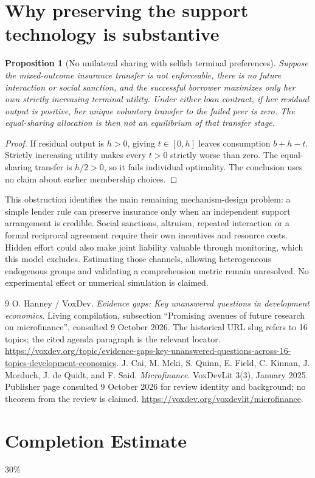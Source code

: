 \documentclass[11pt]{article}
\newtheorem{proposition}[theorem]{Proposition}
\theoremstyle{remark}
\begin{document}
\section{Why preserving the support technology is substantive}
\begin{proposition}[No unilateral sharing with selfish terminal preferences]
Suppose the mixed-outcome insurance transfer is not enforceable, there is
no future interaction or social sanction, and the successful borrower
maximizes only her own strictly increasing terminal utility. Under either
loan contract, if her residual output is positive, her unique voluntary
transfer to the failed peer is zero. The equal-sharing allocation is then
not an equilibrium of that transfer stage.
\end{proposition}
\begin{proof}
If residual output is $h>0$, giving $t\in[0,h]$ leaves consumption
$b+h-t$. Strictly increasing utility makes every $t>0$ strictly worse
than zero. The equal-sharing transfer is $h/2>0$, so it fails individual
optimality. The conclusion uses no claim about earlier membership choices.
\end{proof}
This obstruction identifies the main remaining mechanism-design problem:
a simple lender rule can preserve insurance only when an independent
support arrangement is credible. Social sanctions, altruism, repeated
interaction or a formal reciprocal agreement require their own incentives
and resource costs. Hidden effort could also make joint liability valuable
through monitoring, which this model excludes. Estimating those channels,
allowing heterogeneous endogenous groups and validating a comprehension
metric remain unresolved. No experimental effect or numerical simulation
is claimed.

\begin{thebibliography}{9}
 O. Hanney / VoxDev.
\emph{Evidence gaps: Key unanswered questions in development economics}.
Living compilation, subsection ``Promising avenues of future research on
microfinance'', consulted 9 October 2026. The historical URL slug refers
to 16 topics; the cited agenda paragraph is the relevant locator.
\url{https://voxdev.org/topic/evidence-gaps-key-unanswered-questions-across-16-topics-development-economics}.
 J. Cai, M. Meki, S. Quinn, E. Field, C. Kinnan,
J. Morduch, J. de Quidt, and F. Said. \emph{Microfinance}.
VoxDevLit 3(3), January 2025. Publisher page consulted 9 October 2026
for review identity and background; no theorem from the review is claimed.
\url{https://voxdev.org/voxdevlit/microfinance}.
\end{thebibliography}

\section{Completion Estimate}
30\%
\end{document}
